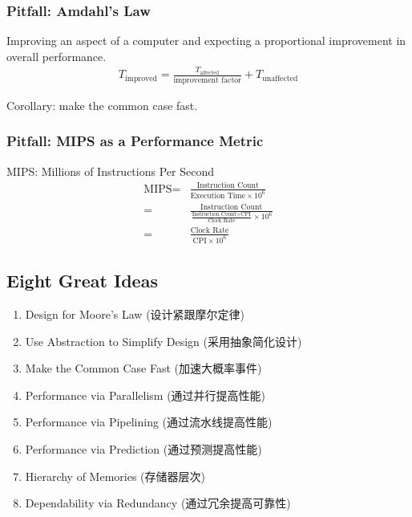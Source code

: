 \subsubsection{Pitfall: Amdahl’s Law}
Improving an aspect of a computer and expecting a proportional improvement in overall performance. 
\begin{align*}
    T_{\text{improved}}=\frac{T_{\text{affected}}}{\text{improvement factor}}+T_{\text{unaffected}}
\end{align*}

Corollary: make the common case fast. 

\subsubsection{Pitfall: MIPS as a Performance Metric}
MIPS: Millions of Instructions Per Second
\begin{align*}
    \text{MIPS}=&\frac{\text{Instruction Count}}{\text{Execution Time}\times 10^6}\\
    =& \frac{\text{Instruction Count}}{\frac{\text{Instruction Count}\times \text{CPI}}{\text{Clock Rate}}\times 10^6} \\
    =&\frac{\text{Clock Rate}}{\text{CPI}\times 10^6}
\end{align*}

\subsection{Eight Great Ideas}
\begin{enumerate}
    \item Design for Moore’s Law (设计紧跟摩尔定律)
    \item Use Abstraction to Simplify Design (采用抽象简化设计)
    \item Make the Common Case Fast (加速大概率事件)
    \item Performance via Parallelism (通过并行提高性能)
    \item Performance via Pipelining (通过流水线提高性能)
    \item Performance via Prediction (通过预测提高性能)
    \item Hierarchy of Memories (存储器层次)
    \item Dependability via Redundancy (通过冗余提高可靠性)
\end{enumerate}
